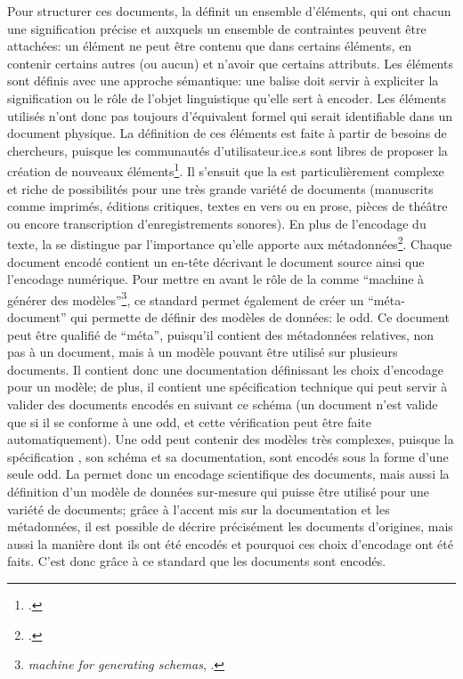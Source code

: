 Pour structurer ces documents, la \tei{} définit un ensemble d'éléments, qui ont chacun une signification précise et auxquels un ensemble de contraintes peuvent être attachées: un élément ne peut être contenu que dans certains éléments, en contenir certains autres (ou aucun) et n'avoir que certains attributs. Les éléments sont définis avec une approche sémantique: une balise doit servir à expliciter la signification ou le rôle de l'objet linguistique qu'elle sert à encoder. Les éléments utilisés n'ont donc pas toujours d'équivalent formel qui serait identifiable dans un document physique. La définition de ces éléments est faite à partir de besoins de chercheurs, puisque les communautés d'utilisateur.ice.s sont libres de proposer la création de nouveaux éléments\footcite[p. 110]{burnard_how_2019}. Il s'ensuit que la \tei{} est particulièrement complexe et riche de possibilités pour une très grande variété de documents (manuscrits comme imprimés, éditions critiques, textes en vers ou en prose, pièces de théâtre ou encore transcription d'enregistrements sonores). En plus de l'encodage du texte, la \tei{} se distingue par l'importance qu'elle apporte aux métadonnées\footcite[p. 104]{burnard_how_2019}. Chaque document encodé contient un en-tête décrivant le document source ainsi que l'encodage numérique. Pour mettre en avant le rôle de la \tei{} comme \enquote{machine à générer des modèles}\footnote{\textit{machine for generating schemas}, \cite[§ 30]{burnard_what_2019}.}, ce standard permet également de créer un \enquote{méta-document} \xml{} qui permette de définir des modèles de données: le \gls{odd}. Ce document peut être qualifié de \enquote{méta}, puisqu'il contient des métadonnées relatives, non pas à un document, mais à un modèle pouvant être utilisé sur plusieurs documents. Il contient donc une documentation définissant les choix d'encodage pour un modèle; de plus, il contient une spécification technique qui peut servir à valider des documents encodés en suivant ce schéma (un document \tei{} n'est valide que si il se conforme à une \gls{odd}, et cette vérification peut être faite automatiquement). Une \gls{odd} peut contenir des modèles très complexes, puisque la spécification \tei{}, son schéma et sa documentation, sont encodés sous la forme d'une seule \gls{odd}. La \tei{} permet donc un encodage scientifique des documents, mais aussi la définition d'un modèle de données sur-mesure qui puisse être utilisé pour une variété de documents; grâce à l'accent mis sur la documentation et les métadonnées, il est possible de décrire précisément les documents d'origines, mais aussi la manière dont ils ont été encodés et pourquoi ces choix d'encodage ont été faits. C'est donc grâce à ce standard que les documents sont encodés.

